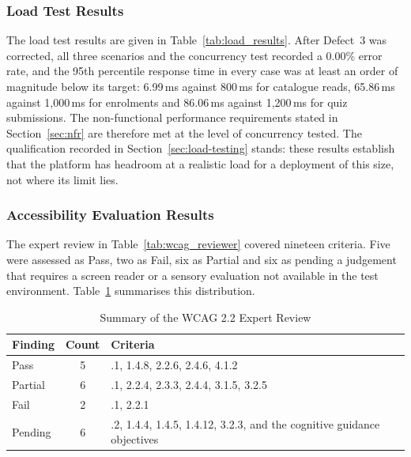 \documentclass[12pt, oneside]{article} %
\begin{document}
\subsubsection{Load Test Results}

The load test results are given in Table~\ref{tab:load_results}. After Defect~3 was corrected, all three scenarios and the concurrency test recorded a 0.00\% error rate, and the 95th percentile response time in every case was at least an order of magnitude below its target: 6.99\,ms against 800\,ms for catalogue reads, 65.86\,ms against 1,000\,ms for enrolments and 86.06\,ms against 1,200\,ms for quiz submissions. The non-functional performance requirements stated in Section~\ref{sec:nfr} are therefore met at the level of concurrency tested. The qualification recorded in Section~\ref{sec:load-testing} stands: these results establish that the platform has headroom at a realistic load for a deployment of this size, not where its limit lies.

\subsubsection{Accessibility Evaluation Results}
\label{sec:walkthrough-results}

The expert review in Table~\ref{tab:wcag_reviewer} covered nineteen criteria. Five were assessed as Pass, two as Fail, six as Partial and six as pending a judgement that requires a screen reader or a sensory evaluation not available in the test environment. Table~\ref{tab:wcag_summary} summarises this distribution.

\begin{table}[H]
\caption{Summary of the WCAG 2.2 Expert Review}
\label{tab:wcag_summary}
\vspace{-4mm}
\begin{center}
\renewcommand{\arraystretch}{1.2}
\footnotesize
\begin{tabular}{|>{\raggedright\arraybackslash}p{3.0cm}|c|>{\raggedright\arraybackslash}p{8.0cm}|}
\hline
\textbf{Finding} & \textbf{Count} & \textbf{Criteria} \\
\hline \hline
Pass & 5 & 1.3.1, 1.4.8, 2.2.6, 2.4.6, 4.1.2 \\ \hline
Partial & 6 & 1.1.1, 2.2.4, 2.3.3, 2.4.4, 3.1.5, 3.2.5 \\ \hline
Fail & 2 & 1.2.1, 2.2.1 \\ \hline
Pending & 6 & 1.2.2, 1.4.4, 1.4.5, 1.4.12, 3.2.3, and the cognitive guidance objectives \\ \hline
\end{tabular}
\end{center}
\end{table}
\end{document}
